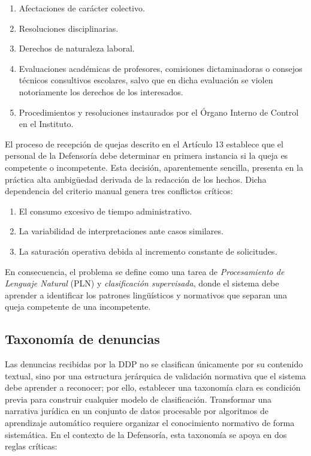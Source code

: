 \begin{enumerate}
  \item Afectaciones de carácter colectivo.
  \item Resoluciones disciplinarias.
  \item Derechos de naturaleza laboral.
  \item Evaluaciones académicas de profesores, comisiones dictaminadoras o
        consejos técnicos consultivos escolares, salvo que en dicha evaluación
        se violen notoriamente los derechos de los interesados.
  \item Procedimientos y resoluciones instaurados por el Órgano Interno de
        Control en el Instituto.
\end{enumerate}

El proceso de recepción de quejas descrito en el Artículo 13 establece que el
personal de la Defensoría debe determinar en primera instancia si la queja es
competente o incompetente. Esta decisión, aparentemente sencilla, presenta en la
práctica alta ambigüedad derivada de la redacción de los hechos. Dicha
dependencia del criterio manual genera tres conflictos críticos:

\begin{enumerate}
  \item El consumo excesivo de tiempo administrativo.
  \item La variabilidad de interpretaciones ante casos similares.
  \item La saturación operativa debida al incremento constante de solicitudes.
\end{enumerate}

En consecuencia, el problema se define como una tarea de \textit{Procesamiento
de Lenguaje Natural} (PLN) y \textit{clasificación supervisada}, donde el sistema
debe aprender a identificar los patrones lingüísticos y normativos que separan
una queja competente de una incompetente.

\subsection{Taxonomía de denuncias}

Las denuncias recibidas por la DDP no se clasifican únicamente por su contenido
textual, sino por una estructura jerárquica de validación normativa que el
sistema debe aprender a reconocer; por ello, establecer una taxonomía clara es
condición previa para construir cualquier modelo de clasificación. Transformar
una narrativa jurídica en un conjunto de datos procesable por algoritmos de
aprendizaje automático requiere organizar el conocimiento normativo de forma
sistemática. En el contexto de la Defensoría, esta taxonomía se apoya en dos
reglas críticas:

